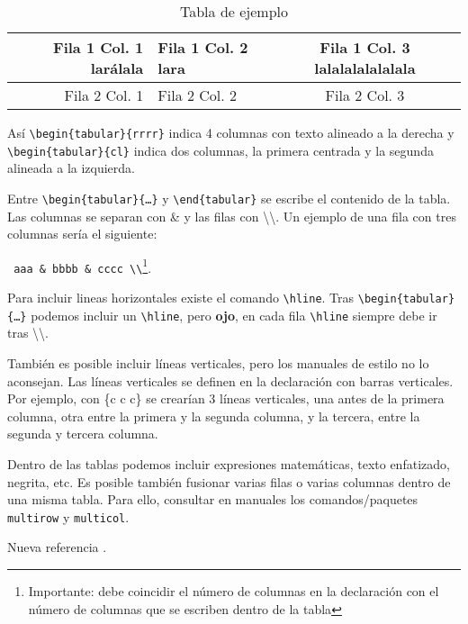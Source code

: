 \begin{table}[htp]
\caption{Tabla de ejemplo}
\label{tab:tabla_ejemplo}
\begin{center}
 \begin{tabular}{rlc}\hline
  Fila 1 Col. 1 larálala & Fila 1 Col. 2 lara & Fila 1 Col. 3  lalalalalalalala\\ \hline
  Fila 2 Col. 1 & Fila 2 Col. 2 & Fila 2 Col. 3 \\ \hline
 \end{tabular}
\end{center}
\end{table}

Así \texttt{\textbackslash begin\{tabular\}\{rrrr\}} indica 4 columnas con texto alineado a la derecha y \texttt{\textbackslash begin\{tabular\}\{cl\}} indica dos columnas, la primera centrada y la segunda alineada a la izquierda.

Entre \texttt{\textbackslash begin\{tabular\}\{\ldots\}} y \texttt{\textbackslash end\{tabular\}} se escribe el contenido de la tabla. Las columnas se separan con \& y las filas con \textbackslash \textbackslash. Un ejemplo de una fila con tres columnas sería el siguiente:
\begin{center}
 \texttt{ aaa \& bbbb \& cccc \textbackslash \textbackslash}\footnote{Importante: debe coincidir el número de columnas en la declaración con el número de columnas que se escriben dentro de la tabla}. 
\end{center}

Para incluir lineas horizontales existe el comando \texttt{\textbackslash hline}. Tras \texttt{\textbackslash begin\{tabular\}\{\ldots\}} podemos incluir un \texttt{\textbackslash hline}, pero \textbf{ojo}, en cada fila \texttt{\textbackslash hline} siempre debe ir tras \textbackslash \textbackslash.

También es posible incluir líneas verticales, pero los manuales de estilo no lo aconsejan. Las líneas verticales se definen en la declaración con barras verticales. Por ejemplo, con \{\textbar c  \textbar c \textbar c\}  se crearían 3 líneas verticales, una antes de la primera columna, otra entre la primera y la segunda columna, y la tercera, entre la segunda y tercera columna.

Dentro de las tablas podemos incluir expresiones matemáticas, texto enfatizado, negrita, etc. Es posible también fusionar varias filas o varias columnas dentro de una misma tabla. Para ello, consultar en manuales los comandos/paquetes \texttt{multirow} y \texttt{multicol}.


Nueva referencia \cite{milibro}.

